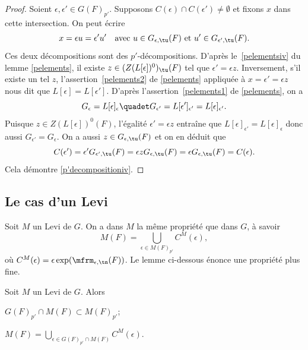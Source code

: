 \begin{proof}
Soient $\epsilon,\epsilon'\in G(F)_{p'}$. Supposons $C(\epsilon )\cap C(\epsilon ')\neq\emptyset$ et fixons $x$ dans cette intersection. On peut écrire
\[
x=\epsilon u=\epsilon 'u'\quad\text{avec }u\in G_{\epsilon ,\tu}(F)\text{ et } u'\in G_{\epsilon ',\tu}(F).
\]
Ces deux décompositions sont des $p'$-décompositions. D'après le~\eqref{pelementsiv} du lemme \ref{pelements}, il existe $z\in (Z(L[\epsilon ])^0)_{\tu}(F)$ tel que $\epsilon '=\epsilon z$. Inversement, s'il existe un tel $z$, l'assertion~\eqref{pelements2} de \ref{pelements} appliquée à $x=\epsilon'=\epsilon z$ nous dit que $L[\epsilon ]=L[\epsilon ']$. D'après l'assertion~\eqref{pelements1} de \ref{pelements}, on a
\[
G_{\epsilon }=L[\epsilon ]_{\epsilon }\quadet G_{\epsilon '}=L[\epsilon ']_{\epsilon '}=L[\epsilon ]_{\epsilon '}.
\]
Puisque $z\in Z(L[\epsilon ])^0(F)$, l'égalité $\epsilon '=\epsilon z$ entraîne que $L[\epsilon ]_{\epsilon '}=L[\epsilon ]_{\epsilon }$ donc aussi $G_{\epsilon '}=G_{\epsilon }$. On a aussi $z\in G_{\epsilon ,\tu}(F)$ et on en déduit que
\[
C(\epsilon ')=\epsilon 'G_{\epsilon ',\tu}(F)=\epsilon zG_{\epsilon ,\tu}(F)=\epsilon G_{\epsilon ,\tu}(F)=C(\epsilon ).
\]
Cela démontre \eqref{p'decompositioniv}.
\end{proof}

\subsection{Le cas d'un Levi}\label{lecasdunlevi}

Soit $M$ un Levi de $G$. On a dans $M$ la même propriété que dans $G$, à savoir
\[
M(F)=\bigcup_{\epsilon\in M(F)_{p'}}C^M(\epsilon),
\]
où $C^M(\epsilon)=\epsilon \exp(\mfrm_{\epsilon,\tn}(F))$. Le lemme ci-dessous énonce une propriété plus fine.

\begin{lem*}
Soit $M$ un Levi de $G$. Alors
\begin{enumeratei}
\item\label{lecasdunlevii}
$G(F)_{p'}\cap M(F)\subset M(F)_{p'}$;

\item\label{lecasdunleviii}
$M(F)=\bigcup_{\epsilon\in G(F)_{p'}\cap M(F)}C^M(\epsilon)$.
\end{enumeratei}
\end{lem*}

